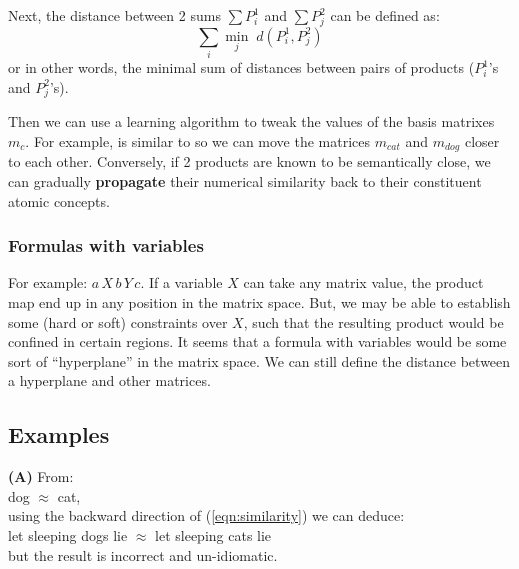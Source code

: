 Next, the distance between 2 sums $\sum P^1_i$ and $\sum P^2_j$ can be defined as:
\begin{equation}
{\displaystyle \sum_i {\displaystyle \min_j } \; d(P^1_i, P^2_j) }
\label{eqn:sum-distance}
\end{equation}
or in other words, the minimal sum of distances between pairs of products ($P^1_i$'s and $P^2_j$'s).

Then we can use a learning algorithm to tweak the values of the basis matrixes $m_c$.  For example,  is similar to  so we can move the matrices $m_{cat}$ and $m_{dog}$ closer to each other.  Conversely, if 2 products are known to be semantically close, we can gradually \textbf{propagate} their numerical similarity back to their constituent atomic concepts.


\subsubsection{Formulas with variables}

For example: $a \, X \, b \, Y \, c$.  If a variable $X$ can take any matrix value, the product map end up in any position in the matrix space.  But, we may be able to establish some (hard or soft) constraints over $X$, such that the resulting product would be confined in certain regions.  It seems that a formula with variables would be some sort of ``hyperplane'' in the matrix space.  We can still define the distance between a hyperplane and other matrices.

\subsection{Examples}

\textbf{(A)} From:\\
\tab dog $\approx$ cat, \\
using the backward direction of (\ref{eqn:similarity}) we can deduce: \\
\tab let sleeping dogs lie $\approx$ let sleeping cats lie \\
but the result is incorrect and un-idiomatic.  

